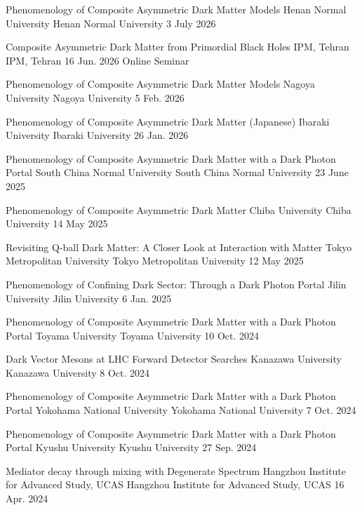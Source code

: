 \begin{talklist}

\talkentry
  {Phenomenology of Composite Asymmetric Dark Matter Models}
  {Henan Normal University}
  {Henan Normal University}
  {3 July 2026}
  {}

\talkentry
  {Composite Asymmetric Dark Matter from Primordial Black Holes}
  {IPM, Tehran}
  {IPM, Tehran}
  {16 Jun. 2026}
  {Online Seminar}

\talkentry
  {Phenomenology of Composite Asymmetric Dark Matter Models}
  {Nagoya University}
  {Nagoya University}
  {5 Feb. 2026}
  {}

\talkentry
  {Phenomenology of Composite Asymmetric Dark Matter (Japanese)}
  {Ibaraki University}
  {Ibaraki University}
  {26 Jan. 2026}
  {}

\talkentry
  {Phenomenology of Composite Asymmetric Dark Matter with a Dark Photon Portal}
  {South China Normal University}
  {South China Normal University}
  {23 June 2025}
  {}

\talkentry
  {Phenomenology of Composite Asymmetric Dark Matter}
  {Chiba University}
  {Chiba University}
  {14 May 2025}
  {}

\talkentry
  {Revisiting Q-ball Dark Matter: A Closer Look at Interaction with Matter}
  {Tokyo Metropolitan University}
  {Tokyo Metropolitan University}
  {12 May 2025}
  {}

\talkentry
  {Phenomenology of Confining Dark Sector: Through a Dark Photon Portal}
  {Jilin University}
  {Jilin University}
  {6 Jan. 2025}
  {}

\talkentry
  {Phenomenology of Composite Asymmetric Dark Matter with a Dark Photon Portal}
  {Toyama University}
  {Toyama University}
  {10 Oct. 2024}
  {}

\talkentry
  {Dark Vector Mesons at LHC Forward Detector Searches}
  {Kanazawa University}
  {Kanazawa University}
  {8 Oct. 2024}
  {}

\talkentry
  {Phenomenology of Composite Asymmetric Dark Matter with a Dark Photon Portal}
  {Yokohama National University}
  {Yokohama National University}
  {7 Oct. 2024}
  {}

\talkentry
  {Phenomenology of Composite Asymmetric Dark Matter with a Dark Photon Portal}
  {Kyushu University}
  {Kyushu University}
  {27 Sep. 2024}
  {}

\talkentry
  {Mediator decay through mixing with Degenerate Spectrum}
  {Hangzhou Institute for Advanced Study, UCAS}
  {Hangzhou Institute for Advanced Study, UCAS}
  {16 Apr. 2024}
  {}


\end{talklist}

